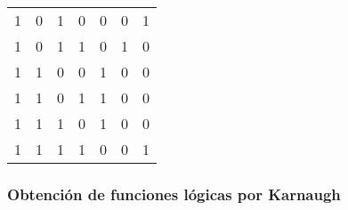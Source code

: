 \begin{center}
\begin{tabular}{|cccc|ccc|}
1              & 0              & 1              & 0                                                           & 0              & 0              & 1              \\
1              & 0              & 1              & 1                                                           & 0              & 1              & 0              \\
1              & 1              & 0              & 0                                                           & 1              & 0              & 0              \\
1              & 1              & 0              & 1                                                           & 1              & 0              & 0              \\
1              & 1              & 1              & 0                                                           & 1              & 0              & 0              \\
1              & 1              & 1              & 1                                                           & 0              & 0              & 1              \\ \hline
\end{tabular}
\end{center}
\subsubsection{Obtención de funciones lógicas por Karnaugh}

\begin{center}
\begin{Karnaugh}
\end{Karnaugh} \end{center}


\begin{center}
\begin{Karnaugh}
\end{Karnaugh} \end{center}

